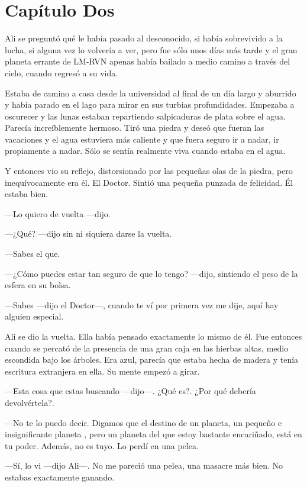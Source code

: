 \chapter*{Capítulo Dos}


Ali se preguntó qué le había pasado al desconocido, si había sobrevivido
a la lucha, si alguna vez lo volvería a ver, pero fue sólo unos días más
tarde y el gran planeta errante de LM-RVN apenas había bailado a medio
camino a través del cielo, cuando regresó a su vida.

Estaba de camino a casa desde la universidad al final de un día largo y
aburrido y había parado en el lago para mirar en sus turbias
profundidades. Empezaba a oscurecer y las lunas estaban repartiendo
salpicaduras de plata sobre el agua. Parecía increíblemente hermoso.
Tiró una piedra y deseó que fueran las vacaciones y el agua estuviera
más caliente y que fuera seguro ir a nadar, ir propiamente a nadar. Sólo
se sentía realmente viva cuando estaba en el agua.

Y entonces vio su reflejo, distorsionado por las pequeñas olas de la
piedra, pero inequívocamente era él. El Doctor. Sintió una pequeña
punzada de felicidad. Él estaba bien.

---Lo quiero de vuelta ---dijo.

---¿Qué? ---dijo sin ni siquiera darse la vuelta.

---Sabes el que.

---¿Cómo puedes estar tan seguro de que lo tengo? ---dijo, sintiendo el
peso de la esfera en su bolsa.

---Sabes ---dijo el Doctor---, cuando te ví por primera vez me dije,
aquí hay alguien especial.

Ali se dio la vuelta. Ella había pensado exactamente lo mismo de él. Fue
entonces cuando se percató de la presencia de una gran caja en las
hierbas altas, medio escondida bajo los árboles. Era azul, parecía que
estaba hecha de madera y tenía escritura extranjera en ella. Su mente
empezó a girar.

---Esta cosa que estas buscando ---dijo---. ¿Qué es?. ¿Por qué debería
devolvértela?.

---No te lo puedo decir. Digamos que el destino de un planeta, un
pequeño e insignificante planeta , pero un planeta del que estoy
bastante encariñado, está en tu poder. Además, no es tuyo. Lo perdí en
una pelea.

---Sí, lo vi ---dijo Ali---. No me pareció una pelea, una masacre más
bien. No estabas exactamente ganando.

